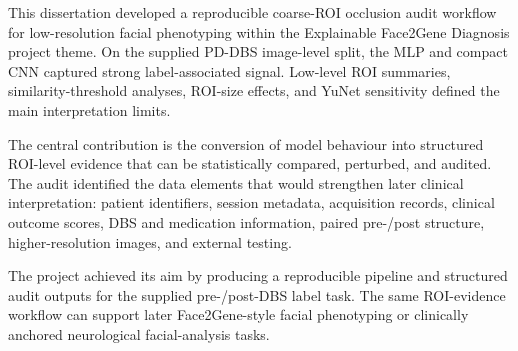 
This dissertation developed a reproducible coarse-ROI occlusion audit workflow for low-resolution facial phenotyping within the Explainable Face2Gene Diagnosis project theme. On the supplied PD-DBS image-level split, the MLP and compact CNN captured strong label-associated signal. Low-level ROI summaries, similarity-threshold analyses, ROI-size effects, and YuNet sensitivity defined the main interpretation limits.


The central contribution is the conversion of model behaviour into structured ROI-level evidence that can be statistically compared, perturbed, and audited. The audit identified the data elements that would strengthen later clinical interpretation: patient identifiers, session metadata, acquisition records, clinical outcome scores, DBS and medication information, paired pre-/post structure, higher-resolution images, and external testing.


The project achieved its aim by producing a reproducible pipeline and structured audit outputs for the supplied pre-/post-DBS label task. The same ROI-evidence workflow can support later Face2Gene-style facial phenotyping or clinically anchored neurological facial-analysis tasks.



